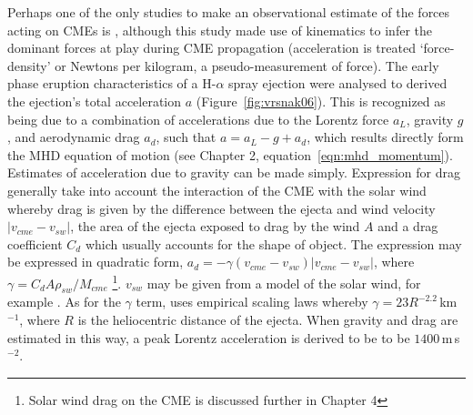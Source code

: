 Perhaps one of the only studies to make an observational estimate of the forces acting on CMEs is \citet{vrs06}, although this study made use of kinematics to infer the dominant forces at play during CME propagation (acceleration is treated  \textquoteleft force-density' or Newtons per kilogram, a pseudo-measurement of force). The early phase eruption characteristics of a H-$\alpha$ spray ejection were analysed to derived the ejection's total acceleration $a$ (Figure~\ref{fig:vrsnak06}). This is recognized as being due to a combination of accelerations due to the Lorentz force $a_L$, gravity $g$, and aerodynamic drag $a_d$, such that $a = a_L -g +a_d$, which results directly form the MHD equation of motion (see Chapter 2, equation~\ref{eqn:mhd_momentum}). Estimates of acceleration due to gravity can be made simply. Expression for drag generally take into account the interaction of the CME with the solar wind whereby drag is given by the difference between the ejecta and wind velocity $|v_{cme} - v_{sw}|$, the area of the ejecta exposed to drag by the wind $A$ and a drag coefficient $C_d$ which usually accounts for the shape of object. The expression may be expressed in quadratic form, $a_d = - \gamma(v_{cme} - v_{sw})|v_{cme} - v_{sw}|$, where $\gamma = C_dA\rho_{sw}/M_{cme}$ \citep{cargill2004}\footnote{Solar wind drag on the CME is discussed further in Chapter 4}. $v_{sw}$ may be given from a model of the solar wind, for example \citet{sheeley1997}. As for the $\gamma$ term,\citet{vrs06} uses empirical scaling laws whereby $\gamma =  23R^{-2.2}$\,km$^{-1}$, where $R$ is the heliocentric distance of the ejecta. When gravity and drag are estimated in this way, a peak Lorentz acceleration is derived to be to be $1400$\,m\,s$^{-2}$. 

